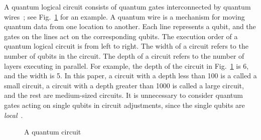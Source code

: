 \documentclass[runningheads]{llncs}
\newcommand{\leaveout}[1]{}
\begin{document}
A quantum logical circuit 
consists of quantum gates interconnected by quantum wires~\cite{Daei2020}; see Fig.~\ref{OriginalCircuit} for an example.
A quantum wire is a mechanism for moving quantum data from one location to another.
Each line represents a qubit, and the gates on the lines act on the corresponding qubits.
The execution order of a quantum logical circuit  is from left to right.
The width %
of a circuit refers to the number of qubits in the circuit.
The depth %
of a circuit refers to the number of layers executing in parallel.
For example, the depth of the circuit in Fig.~\ref{OriginalCircuit} is 6, and the width is 5.
In this paper, a circuit with a depth less than 100 is a called a small circuit,
a circuit with a depth greater than 1000 is called a large circuit,
and the rest are medium-sized circuits.
It is unnecessary to consider quantum gates acting on single qubits in circuit adjustments, since the single qubits are \emph{local}~\cite{Shafaei2013}.
\begin{figure}[h!] 
	\begin{center}
		  {
	}
	\end{center}					 
	\caption{A quantum circuit}
	\label{OriginalCircuit}	
\end{figure}
\end{document}

